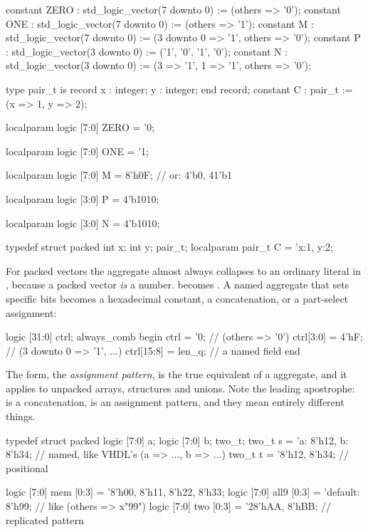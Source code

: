 \begin{rosetta}
\begin{rleft}
constant ZERO : std_logic_vector(7 downto 0)
  := (others => '0');
constant ONE : std_logic_vector(7 downto 0)
  := (others => '1');
constant M : std_logic_vector(7 downto 0)
  := (3 downto 0 => '1', others => '0');
constant P : std_logic_vector(3 downto 0)
  := ('1', '0', '1', '0');
constant N : std_logic_vector(3 downto 0)
  := (3 => '1', 1 => '1', others => '0');

type pair_t is record
  x : integer; y : integer;
end record;
constant C : pair_t := (x => 1, y => 2);
\end{rleft}
\begin{rright}
localparam logic [7:0] ZERO = '0;

localparam logic [7:0] ONE = '1;

localparam logic [7:0] M = 8'h0F;
// or: {4'b0, {4{1'b1}}}

localparam logic [3:0] P = 4'b1010;

localparam logic [3:0] N = 4'b1010;


typedef struct packed {
  int x; int y;
} pair_t;
localparam pair_t C = '{x:1, y:2};
\end{rright}
\end{rosetta}


For packed vectors the \VHDL{} aggregate almost always collapses to an ordinary
literal in \SV{}, because a packed vector \emph{is} a number.  becomes . A named aggregate that sets specific bits becomes a
hexadecimal constant, a concatenation, or a part-select assignment:

\begin{svcode}[caption={Setting a field of a vector.},label={lst:rosetta:fieldset}]
logic [31:0] ctrl;
always_comb begin
  ctrl          = '0;      // (others => '0')
  ctrl[3:0]     = 4'hF;    // (3 downto 0 => '1', ...)
  ctrl[15:8]    = len_q;   // a named field
end
\end{svcode}

The  form, the \emph{assignment pattern}, is the true equivalent
of a \VHDL{} aggregate, and it applies to unpacked arrays, structures and
unions. Note the leading apostrophe:  is a concatenation,
 is an assignment pattern, and they mean entirely different
things.

\begin{svcode}[caption={Assignment patterns for composite types.},label={lst:rosetta:patterns}]
typedef struct packed { logic [7:0] a; logic [7:0] b; } two_t;
two_t   s = '{a: 8'h12, b: 8'h34};   // named, like VHDL's (a => ..., b => ...)
two_t   t = '{8'h12, 8'h34};         // positional

logic [7:0] mem [0:3] = '{8'h00, 8'h11, 8'h22, 8'h33};
logic [7:0] all9 [0:3] = '{default: 8'h99};   // like (others => x"99")
logic [7:0] two [0:3]  = '{2{8'hAA, 8'hBB}};  // replicated pattern
\end{svcode}

